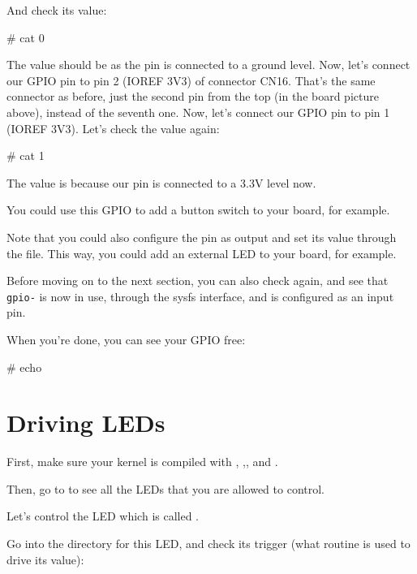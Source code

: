 And check its value:

\begin{bashinput}
# cat %
0
\end{bashinput}

The value should be  as the pin is connected to a ground level.
\if{}
Now, let's connect our GPIO pin to pin 2 (IOREF 3V3) of connector CN16.
That's the same connector as before, just the second pin from the top
(in the board picture above), instead of the seventh one.
\fi
\if{}
Now, let's connect our GPIO pin to pin 1 (IOREF 3V3).
\fi
Let's check the value again:

\begin{bashinput}
# cat %
1
\end{bashinput}

The value is  because our pin is connected to a 3.3V level now.

You could use this GPIO to add a button switch to your board, for
example.

Note that you could also configure the pin as output and set its value
through the  file. This way, you could add an external LED
to your board, for example.

Before moving on to the next section, you can also check
 again, and see that {\tt gpio-\gpionum} is now
in use, through the sysfs interface, and is configured as an input pin.

When you're done, you can see your GPIO free:

\begin{bashinput}
# echo %
\end{bashinput}

\section{Driving LEDs}

First, make sure your kernel is compiled with
, 
,, 
and .

Then, go to  to see all the LEDs that you are allowed
to control.

Let's control the LED which is called
.

Go into the directory for this LED, and check its trigger (what
routine is used to drive its value):

